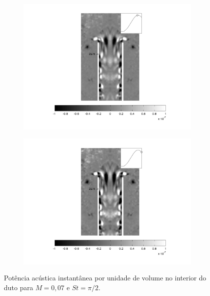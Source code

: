 \begin{landscape}
\begin{figure}[ht!]
\begin{subfigure}{0.55 \textwidth}
  \includegraphics[width=1.\linewidth]{figuras/max_ka_007_5.png}
  \caption[]{}
  \label{fig:max_007_5}
\end{subfigure}
\begin{subfigure}{0.55 \textwidth}
  \includegraphics[width=1.\linewidth]{figuras/max_ka_007_6.png}
  \caption[]{}
  \label{fig:max_007_6}
\end{subfigure}
\caption[Potência acústica instantânea por unidade de volume para $M = 0,07$ e $St = \pi/2$.]{Potência acústica instantânea por unidade de volume no interior do duto para $M = 0,07$ e $St = \pi/2$.}\label{fig:max_007}
\end{figure}
\vfill
\clearpage
\end{landscape}


